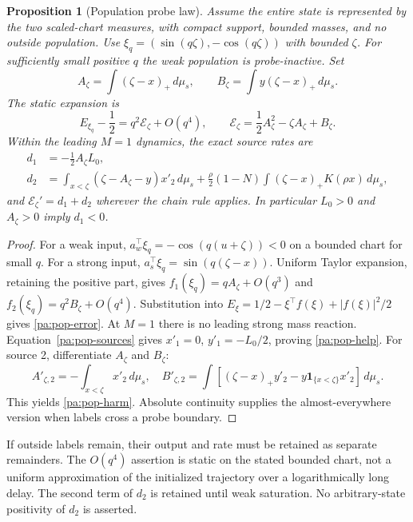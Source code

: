 \documentclass[11pt]{article}
\numberwithin{equation}{section}
\newtheorem{proposition}{Proposition}[section]
\theoremstyle{definition}
\theoremstyle{remark}
\newcommand{\1}{\mathbf 1}
\newcommand{\dd}{\,d}
\begin{document}
\begin{proposition}[Population probe law]\label{pa:probe-pop}
Assume the entire state is represented by the two scaled-chart measures,
with compact support, bounded masses, and no outside population. Use $\xi_q=(\sin(q\zeta),-\cos(q\zeta))$ with bounded $\zeta$.
For sufficiently small positive $q$ the weak population is probe-inactive.
Set
\begin{equation}\label{pa:exposure}
 A_\zeta=\int(\zeta-x)_+\dd\mu_s,\qquad
 B_\zeta=\int y(\zeta-x)_+\dd\mu_s.
\end{equation}
The static expansion is
\begin{equation}\label{pa:pop-error}
 E_{\xi_q}-\frac12=q^2\mathcal E_\zeta+O(q^4),\qquad
 \mathcal E_\zeta=\frac12A_\zeta^2-\zeta A_\zeta+B_\zeta.
\end{equation}
Within the leading $M=1$ dynamics, the exact source rates are
\begin{align}
 d_1&=-\tfrac12A_\zeta L_0,\label{pa:pop-help}\\
 d_2&=\int_{x<\zeta}(\zeta-A_\zeta-y)x'_2\dd\mu_s
 +\frac\rho2(1-N)\int(\zeta-x)_+K(\rho x)\dd\mu_s,\label{pa:pop-harm}
\end{align}
and $\mathcal E_\zeta'=d_1+d_2$ wherever the chain rule applies.
In particular $L_0>0$ and $A_\zeta>0$ imply $d_1<0$.
\end{proposition}
\begin{proof}
For a weak input,
$a_w^\top\xi_q=-\cos(q(u+\zeta))<0$ on a bounded chart for small $q$.
For a strong input,
$a_s^\top\xi_q=\sin(q(\zeta-x))$. Uniform Taylor expansion, retaining the
positive part, gives
$f_1(\xi_q)=qA_\zeta+O(q^3)$ and
$f_2(\xi_q)=q^2B_\zeta+O(q^4)$. Substitution into
$E_\xi=1/2-\xi^\top f(\xi)+|f(\xi)|^2/2$ gives
\eqref{pa:pop-error}. At $M=1$ there is no leading strong mass reaction.
Equation~\eqref{pa:pop-sources} gives $x'_1=0$, $y'_1=-L_0/2$, proving
\eqref{pa:pop-help}. For source 2, differentiate $A_\zeta$ and $B_\zeta$:
\[
 A'_{\zeta,2}=-\int_{x<\zeta}x'_2\dd\mu_s,\quad
 B'_{\zeta,2}=\int[(\zeta-x)_+y'_2-y\1_{\{x<\zeta\}}x'_2]\dd\mu_s.
\]
This yields \eqref{pa:pop-harm}. Absolute continuity supplies the
almost-everywhere version when labels cross a probe boundary.
\end{proof}
If outside labels remain, their output and rate must be retained as separate
remainders. The $O(q^4)$ assertion is static on the stated bounded chart,
not a uniform approximation of the initialized trajectory over a
logarithmically long delay. The second term of $d_2$ is retained until weak saturation.
No arbitrary-state positivity of $d_2$ is asserted.
\end{document}
